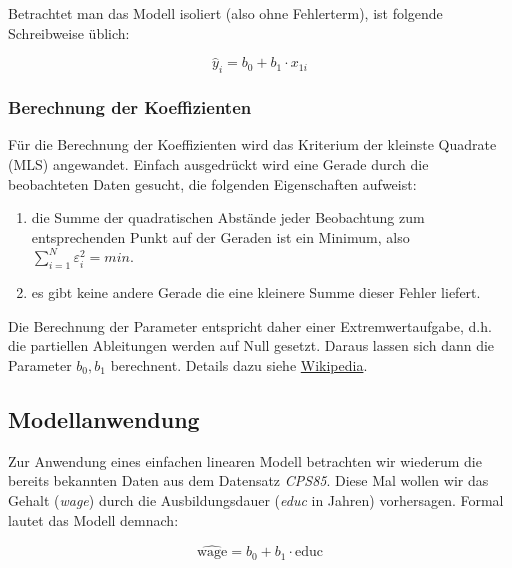 \documentclass[]{article}
\providecommand{\tightlist}{%
  \setlength{\itemsep}{0pt}\setlength{\parskip}{0pt}}
\begin{document}
Betrachtet man das Modell isoliert (also ohne Fehlerterm), ist folgende
Schreibweise üblich:

\begin{equation} 
  \hat{y}_i = b_0 + b_1 \cdot x_{1i}
  \label{eq:LinMod}
\end{equation}

\subsubsection*{Berechnung der
Koeffizienten}\label{berechnung-der-koeffizienten}

Für die Berechnung der Koeffizienten wird das Kriterium der kleinste
Quadrate (MLS) angewandet. Einfach ausgedrückt wird eine Gerade durch
die beobachteten Daten gesucht, die folgenden Eigenschaften aufweist:

\begin{enumerate}
\def\labelenumi{\arabic{enumi}.}
\tightlist
\item
  die Summe der quadratischen Abstände jeder Beobachtung zum
  entsprechenden Punkt auf der Geraden ist ein Minimum, also
  \(\sum_{i=1}^{N} \varepsilon_i^2 = min\).
\item
  es gibt keine andere Gerade die eine kleinere Summe dieser Fehler
  liefert.
\end{enumerate}

Die Berechnung der Parameter entspricht daher einer Extremwertaufgabe,
d.h. die partiellen Ableitungen werden auf Null gesetzt. Daraus lassen
sich dann die Parameter \(b_0, b_1\) berechnent. Details dazu siehe
\href{https://de.wikipedia.org/wiki/Einfache_lineare_Regression}{Wikipedia}.

\subsection*{Modellanwendung}\label{modellanwendung}

Zur Anwendung eines einfachen linearen Modell betrachten wir wiederum
die bereits bekannten Daten aus dem Datensatz \emph{CPS85}. Diese Mal
wollen wir das Gehalt (\emph{wage}) durch die Ausbildungsdauer
(\emph{educ} in Jahren) vorhersagen. Formal lautet das Modell demnach:

\begin{equation} 
   \hat{\textrm{wage}} = b_0 + b_1 \cdot \textrm{educ}
  \label{eq:LinModBsp1}
\end{equation}
\end{document}
